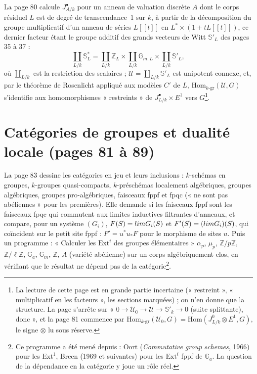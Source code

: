 \documentclass[11pt,a4paper]{article}
\begin{document}
La page 80 calcule $J^{\bullet}_{A/k}$ pour un anneau de valuation discrète $A$
dont le corps résiduel $L$ est de degré de transcendance~$1$ sur $k$, à partir de
la décomposition du groupe multiplicatif d'un anneau de séries $L[[t]]$ en
$L^{*} \times (1 + tL[[t]])$, ce dernier facteur étant le groupe additif des
grands vecteurs de Witt $\mathbb{S}'_L$ des pages 35 à 37 :
\[
\coprod_{L/k} \mathbb{S}^{*}_L = \coprod_{L/k} \mathbb{Z}_L \times \coprod_{L/k}
\mathbb{G}_{m,L} \times \coprod_{L/k} \mathbb{S}'_L,
\]
où $\coprod_{L/k}$ est la restriction des scalaires ; $\mathcal{U} = \coprod_{L/k}
\mathbb{S}'_L$ est unipotent connexe, et, par le théorème de Rosenlicht appliqué
aux modèles $C'$ de $L$, $\mathrm{Hom}_{k\text{-gr}}(\mathcal{U}, G)$ s'identifie
aux homomorphismes « restreints » de $J^{\bullet}_{L/k} \times E^1$ vers
$G$\footnote{La lecture de cette page est en grande partie incertaine
(« restreint », « multiplicatif en les facteurs », les sections marquées) ; on n'en
donne que la structure. La page s'arrête sur « $0 \to \mathcal{U}_0 \to \mathcal{U}
\to \mathbb{S}'_k \to 0$ (suite splittante), donc », et la page 81 commence par
$\mathrm{Hom}_{k\text{-gr}}(\mathcal{U}_0, G) = \mathrm{Hom}(J^0_{L/k} \otimes E^1,
G)$, le signe $\otimes$ lu sous réserve.}.

\section*{Catégories de groupes et dualité locale (pages 81 à 89)}

La page 83 dessine les catégories en jeu et leurs inclusions : $k$-schémas en
groupes, $k$-groupes quasi-compacts, $k$-préschémas localement algébriques,
groupes algébriques, groupes pro-algébriques, faisceaux fppf et fpqc (« ne sont
pas abéliennes » pour les premières). Elle demande si les faisceaux fppf sont les
faisceaux fpqc qui commutent aux limites inductives filtrantes d'anneaux, et
compare, pour un système $(G_i)$, $F(S) = \varinjlim G_i(S)$ et $F'(S) =
(\varprojlim G_i)(S)$, qui coïncident sur le petit site fppf : $F' = u^{*}u_{*}F$
pour le morphisme de sites $u$. Puis un programme : « Calculer les
$\mathrm{Ext}^i$ des groupes élémentaires » $\alpha_p$, $\mu_p$,
$\mathbb{Z}/p\mathbb{Z}$, $\mathbb{Z}/\ell\mathbb{Z}$, $\mathbb{G}_a$,
$\mathbb{G}_m$, $\mathbb{Z}$, $A$ (variété abélienne) sur un corps
algébriquement clos, en vérifiant que le résultat ne dépend pas de la
catégorie\footnote{Ce programme a été mené depuis : Oort (\emph{Commutative group
schemes}, 1966) pour les $\mathrm{Ext}^1$, Breen (1969 et suivantes) pour les
$\mathrm{Ext}^i$ fppf de $\mathbb{G}_a$. La question de la dépendance en la
catégorie y joue un rôle réel.}.
\end{document}
